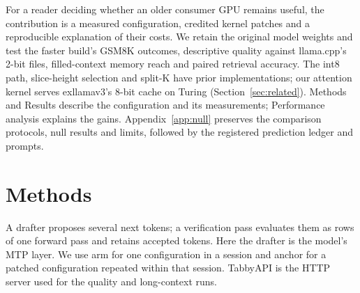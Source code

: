 \documentclass[11pt,letterpaper]{article}
\begin{document}
For a reader deciding whether an older consumer GPU remains useful, the
contribution is a measured configuration, credited kernel patches and a
reproducible explanation of their costs. We retain the original model
weights and test the faster build's GSM8K outcomes, descriptive quality
against llama.cpp's 2-bit files, filled-context memory reach and paired
retrieval accuracy. The int8 path, slice-height selection and split-K have
prior implementations; our attention kernel serves exllamav3's 8-bit cache
on Turing (Section~\ref{sec:related}). Methods and Results describe the
configuration and its measurements; Performance analysis explains the gains.
Appendix~\ref{app:null} preserves the comparison protocols, null results and
limits, followed by the registered prediction ledger and prompts.


\section{Methods}
\label{sec:setup}
A drafter proposes several next tokens; a verification pass evaluates them
as rows of one forward pass and retains accepted tokens. Here the drafter
is the model's MTP layer. We use arm for one configuration in a session and
anchor for a patched configuration repeated within that session. TabbyAPI
is the HTTP server used for the quality and long-context runs.
\end{document}
